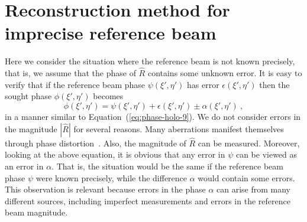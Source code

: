 \section{Reconstruction method for imprecise reference beam}
\label{sec:reconstr-meth-impr} Here we consider the situation
where the reference beam is not known precisely, that is, we
assume that the phase of $\hat{R}$ contains some unknown error. It
is easy to verify that if the reference beam phase
$\psi(\xi',\eta')$ has error $\epsilon(\xi',\eta')$ then the sought
phase $\phi(\xi',\eta')$ becomes
\begin{equation}
  \label{eq:phase-holo-15}
  \phi(\xi',\eta') = \psi(\xi',\eta') + \epsilon(\xi',\eta') \pm
  \alpha(\xi',\eta')\ ,
\end{equation}
in a manner similar to Equation~(\ref{eq:phase-holo-9}). We do not consider
errors in the magnitude $|\hat{R}|$ for several reasons. Many
aberrations manifest themselves through phase
distortion~. Also, the magnitude of
$\hat{R}$ can
be measured. Moreover, looking at the above equation, it is
obvious that any error in $\psi$ can be viewed as an error in
$\alpha$. That is, the situation would be the same if the reference
beam phase $\psi$ were known precisely, while the difference
$\alpha$ would contain some errors. This observation is relevant
because errors in the phase $\alpha$ can arise from many different
sources, including imperfect measurements and errors in the
reference beam magnitude.

